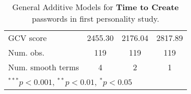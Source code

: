 \begin{table}[!h]
\begin{center}
{\begin{tabular}{l c c c }
	GCV score             & 2455.30        & 2176.04       & 2817.89        \\
	Num. obs.             & 119            & 119           & 119            \\
	Num. smooth terms     & 4              & 2             & 1              \\
	\hline
	\multicolumn{4}{l}{\scriptsize{$^{***}p<0.001$, $^{**}p<0.01$, $^*p<0.05$}}
\end{tabular}}
\caption{General Additive Models for \textbf{Time to Create} passwords in first personality study.}
\label{tab:personality:study-1:timing-models}
\end{center}
\end{table}